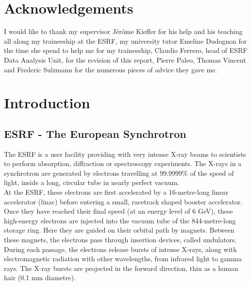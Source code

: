 \documentclass[a4paper, 11pt]{report}
\begin{document}
\chapter*{Acknowledgements}

I would like to thank my supervisor J\'er\^ome Kieffer for his help 
and his teaching all along my traineeship at the ESRF, my university 
tutor Emeline Dudognon for the time she spend to help me for my 
traineeship, Claudio Ferrero, head of ESRF Data Analysis Unit, for the 
revision of this report, Pierre Paleo, Thomas Vincent and Frederic 
Sulzmann for the numerous pieces of advice they gave me.


\tableofcontents
{}


\chapter{Introduction}


\section{ESRF - The European Synchrotron}

The ESRF is a user facility providing with very intense X-ray beams to 
scientists to perform absorption, diffraction or spectroscopy 
experiments. 
The X-rays in a synchrotron are generated by electrons travelling at 
99.9999\% of the speed of light, inside a long, circular tube in nearly 
perfect vacuum.\\

At the ESRF, these electrons are first accelerated by a 16-metre-long 
linear accelerator (linac) before entering a small, racetrack shaped 
booster accelerator. 
Once they have reached their final speed (at an energy level of 6 GeV), 
these high-energy electrons are injected into the vacuum tube of the
844-metre-long storage ring.
Here they are guided on their orbital path by magnets. 
Between these magnets, the electrons pass through insertion 
devices, called undulators.
During each passage, the electrons release bursts of intense X-rays, 
along with electromagnetic radiation with other wavelengths, from 
infrared light to gamma rays. 
The X-ray bursts are projected in the forward direction, thin as a 
human hair (0.1 mm diametre).\\
\end{document}
